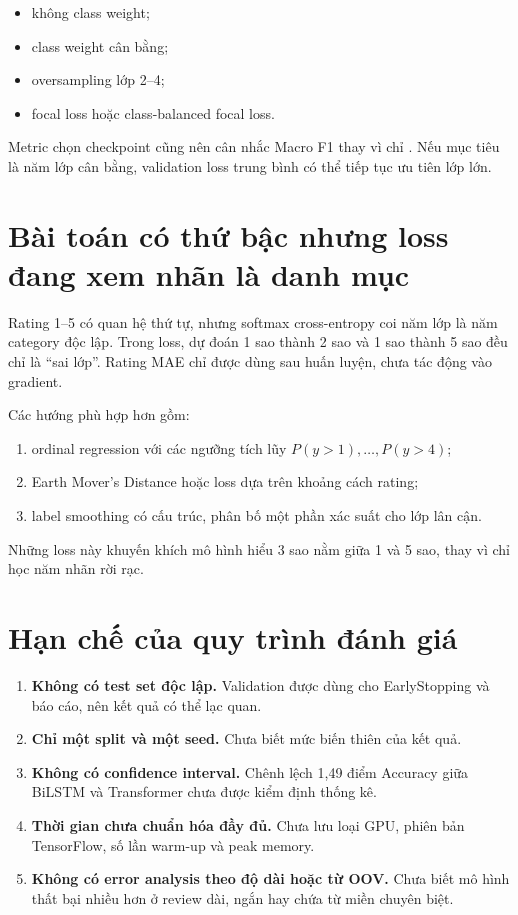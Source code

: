 \documentclass[12pt]{report}
\newcommand{\codeword}[1]{\texttt{\detokenize{#1}}}
\begin{document}
\begin{itemize}
    \item không class weight;
    \item class weight cân bằng;
    \item oversampling lớp 2--4;
    \item focal loss hoặc class-balanced focal loss.
\end{itemize}

Metric chọn checkpoint cũng nên cân nhắc Macro F1 thay vì chỉ
\codeword{val_loss}. Nếu mục tiêu là năm lớp cân bằng, validation loss trung
bình có thể tiếp tục ưu tiên lớp lớn.

\section{Bài toán có thứ bậc nhưng loss đang xem nhãn là danh mục}

Rating 1--5 có quan hệ thứ tự, nhưng softmax cross-entropy coi năm lớp là năm
category độc lập. Trong loss, dự đoán 1 sao thành 2 sao và 1 sao thành 5 sao đều
chỉ là ``sai lớp''. Rating MAE chỉ được dùng sau huấn luyện, chưa tác động vào
gradient.

Các hướng phù hợp hơn gồm:

\begin{enumerate}
    \item ordinal regression với các ngưỡng tích lũy
    $P(y>1),\ldots,P(y>4)$;
    \item Earth Mover's Distance hoặc loss dựa trên khoảng cách rating;
    \item label smoothing có cấu trúc, phân bố một phần xác suất cho lớp lân cận.
\end{enumerate}

Những loss này khuyến khích mô hình hiểu 3 sao nằm giữa 1 và 5 sao, thay vì chỉ
học năm nhãn rời rạc.

\section{Hạn chế của quy trình đánh giá}

\begin{enumerate}
    \item \textbf{Không có test set độc lập.} Validation được dùng cho
    EarlyStopping và báo cáo, nên kết quả có thể lạc quan.
    \item \textbf{Chỉ một split và một seed.} Chưa biết mức biến thiên của kết
    quả.
    \item \textbf{Không có confidence interval.} Chênh lệch 1,49 điểm Accuracy
    giữa BiLSTM và Transformer chưa được kiểm định thống kê.
    \item \textbf{Thời gian chưa chuẩn hóa đầy đủ.} Chưa lưu loại GPU, phiên bản
    TensorFlow, số lần warm-up và peak memory.
    \item \textbf{Không có error analysis theo độ dài hoặc từ OOV.} Chưa biết
    mô hình thất bại nhiều hơn ở review dài, ngắn hay chứa từ miền chuyên biệt.
\end{enumerate}
\end{document}
